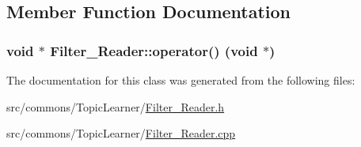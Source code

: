 \subsection{Member Function Documentation}
\hypertarget{class_filter___reader_ac3730d03c07cc3871e044428ab7a1bae}{
\subsubsection[{operator()}]{\setlength{\rightskip}{0pt plus 5cm}void $\ast$ Filter\_\-Reader::operator() (void $\ast$)}}
\label{class_filter___reader_ac3730d03c07cc3871e044428ab7a1bae}


The documentation for this class was generated from the following files:\begin{DoxyCompactItemize}
\item 
src/commons/TopicLearner/\hyperlink{_filter___reader_8h}{Filter\_\-Reader.h}\item 
src/commons/TopicLearner/\hyperlink{_filter___reader_8cpp}{Filter\_\-Reader.cpp}\end{DoxyCompactItemize}
